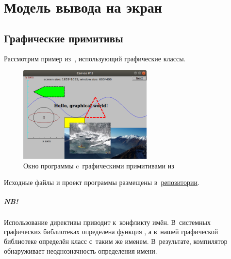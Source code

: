 
\chapter{Модель вывода на экран}

\section{Графические примитивы}
Рассмотрим пример из~, использующий графические классы.

\begin{figure}[ht]
    {\centering
        \includegraphics[width=0.6\textwidth]{images/shapes.png}

    }
    \caption{Окно программы c~графическими примитивами из~}
\end{figure}

\noindent Исходные файлы и проект программы размещены в~\href{\courserepourl}{репозитории}.

\begin{center}
\end{center}



\paragraph{NB!}
Использование директивы  приводит к~конфликту имён. В~системных графических библиотеках  определена функция , а в~нашей графической библиотеке определён класс с~таким же именем. В~результате, компилятор обнаруживает неоднозначность определения имени.

